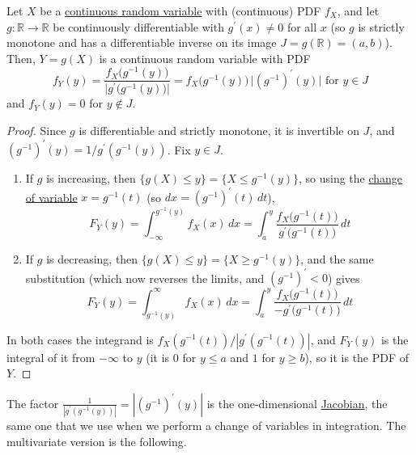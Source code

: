   \begin{theorem}
    \label{thm:density-of-a-monotone-transformation}
    Let $X$ be a \hyperref[def:continuous-random-variable]{continuous random variable} with (continuous) PDF $f_X$, and let $g: \mathbb{R} \to \mathbb{R}$ be continuously differentiable with $g^\prime (x) \neq 0$ for all $x$ (so $g$ is strictly monotone and has a differentiable inverse on its image $J = g(\mathbb{R}) = (a, b)$). Then, $Y = g(X)$ is a continuous random variable with PDF 
    \begin{equation}
      f_Y (y) = \frac{f_X \big( g^{-1} (y) \big)}{\big| g^\prime \big( g^{-1} (y) \big) \big|} = f_X \big( g^{-1} (y) \big) \, \big| (g^{-1})^\prime (y) \big| \text{ for } y \in J
    \end{equation}
    and $f_Y (y) = 0$ for $y \not\in J$. 
  \end{theorem}
  \begin{proof}
    Since $g$ is differentiable and strictly monotone, it is invertible on $J$, and $(g^{-1})^\prime (y) = 1/g^\prime (g^{-1}(y))$. Fix $y \in J$. 
    \begin{enumerate}
      \item If $g$ is increasing, then $\{g(X) \leq y\} = \{X \leq g^{-1} (y)\}$, so using the \hyperref[real-thm:change-of-variable]{change of variable} $x = g^{-1} (t)$ (so $dx = (g^{-1})^\prime (t) \,dt$), 
      \begin{equation}
        F_Y (y) = \int_{-\infty}^{g^{-1} (y)} f_X (x) \,dx = \int_{a}^{y} \frac{f_X \big( g^{-1} (t) \big)}{g^\prime \big( g^{-1} (t) \big)} \,dt
      \end{equation}
      \item If $g$ is decreasing, then $\{g(X) \leq y\} = \{X \geq g^{-1} (y)\}$, and the same substitution (which now reverses the limits, and $(g^{-1})^\prime < 0$) gives 
      \begin{equation}
        F_Y (y) = \int_{g^{-1} (y)}^{\infty} f_X (x) \,dx = \int_{a}^{y} \frac{f_X \big( g^{-1} (t) \big)}{- g^\prime \big( g^{-1} (t) \big)} \,dt
      \end{equation}
    \end{enumerate}
    In both cases the integrand is $f_X (g^{-1}(t)) / |g^\prime (g^{-1}(t))|$, and $F_Y (y)$ is the integral of it from $-\infty$ to $y$ (it is $0$ for $y \leq a$ and $1$ for $y \geq b$), so it is the PDF of $Y$. 
  \end{proof}

  The factor $\frac{1}{|g^\prime (g^{-1}(y))|} = |(g^{-1})^\prime (y)|$ is the one-dimensional \hyperref[mv-def:jacobian]{Jacobian}, the same one that we use when we perform a change of variables in integration. The multivariate version is the following. 

